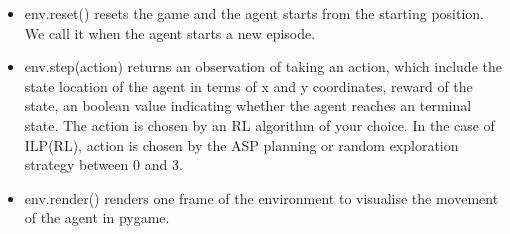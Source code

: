 \begin{itemize}
\item \textsf{env.reset()} resets the game and the agent starts from the starting position. We call it when the agent starts a new episode.
\item \textsf{env.step(action)} returns an observation of taking an action, which include the state location of the agent in terms of x and y coordinates, reward of the state, an boolean value indicating whether the agent reaches an terminal state.
The action is chosen by an RL algorithm of your choice. In the case of ILP(RL), action is chosen by the ASP planning or random exploration strategy between 0 and 3.
\item \textsf{env.render()} renders one frame of the environment to visualise the movement of the agent in pygame.
\end{itemize}








